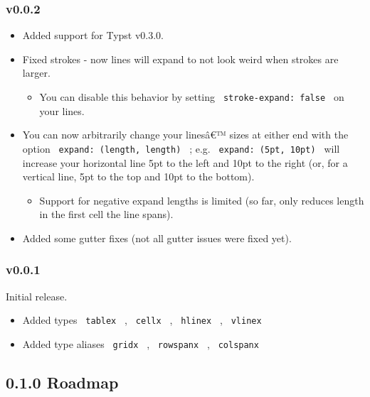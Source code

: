 \subsubsection{v0.0.2}\label{v0.0.2}

\begin{itemize}
\tightlist
\item
  Added support for Typst v0.3.0.
\item
  Fixed strokes - now lines will expand to not look weird when strokes
  are larger.

  \begin{itemize}
  \tightlist
  \item
    You can disable this behavior by setting
    \texttt{\ stroke-expand:\ false\ } on your lines.
  \end{itemize}
\item
  You can now arbitrarily change your linesâ€™ sizes at either end with
  the option \texttt{\ expand:\ (length,\ length)\ } ; e.g.
  \texttt{\ expand:\ (5pt,\ 10pt)\ } will increase your horizontal line
  5pt to the left and 10pt to the right (or, for a vertical line, 5pt to
  the top and 10pt to the bottom).

  \begin{itemize}
  \tightlist
  \item
    Support for negative expand lengths is limited (so far, only reduces
    length in the first cell the line spans).
  \end{itemize}
\item
  Added some gutter fixes (not all gutter issues were fixed yet).
\end{itemize}

\subsubsection{v0.0.1}\label{v0.0.1}

Initial release.

\begin{itemize}
\tightlist
\item
  Added types \texttt{\ tablex\ } , \texttt{\ cellx\ } ,
  \texttt{\ hlinex\ } , \texttt{\ vlinex\ }
\item
  Added type aliases \texttt{\ gridx\ } , \texttt{\ rowspanx\ } ,
  \texttt{\ colspanx\ }
\end{itemize}

\subsection{0.1.0 Roadmap}\label{roadmap}

